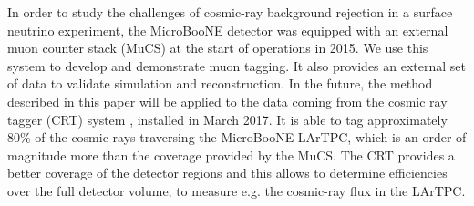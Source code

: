 \documentclass[a4paper,11pt]{article}
\begin{document}
In order to study the challenges of cosmic-ray background rejection in a surface neutrino experiment, the MicroBooNE detector was equipped with an external muon counter stack (MuCS) at the start of operations in 2015. We use this system to develop and demonstrate muon tagging. It also provides an external set of data to validate simulation and reconstruction.
In the future, the method described in this paper will be applied to the data coming from the cosmic ray tagger (CRT) system \cite{crt}, installed in March 2017. It is able to tag approximately $80\%$ of the cosmic rays traversing the MicroBooNE LArTPC, which is an order of magnitude more than the coverage provided by the MuCS. The CRT provides a better coverage of the detector regions and this allows to determine efficiencies over the full detector volume, to measure e.g. the cosmic-ray flux in the LArTPC. %


\end{document}
